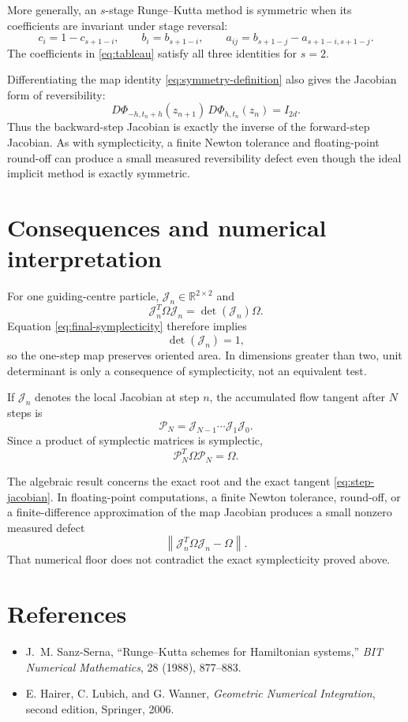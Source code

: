\documentclass[11pt,a4paper]{article}
\newcommand{\R}{\mathbb{R}}
\newcommand{\Id}{I}
\newcommand{\Om}{\Omega}
\newcommand{\Jn}{\mathcal{J}_n}
\begin{document}
More generally, an $s$-stage Runge--Kutta method is symmetric when its
coefficients are invariant under stage reversal:
\begin{equation}
 \boxed{
 c_i=1-c_{s+1-i},
 \qquad
 b_i=b_{s+1-i},
 \qquad
 a_{ij}=b_{s+1-j}-a_{s+1-i,s+1-j}.
 }
 \label{eq:rk-symmetry-condition}
\end{equation}
The coefficients in \eqref{eq:tableau} satisfy all three identities for
$s=2$.

Differentiating the map identity \eqref{eq:symmetry-definition} also gives the
Jacobian form of reversibility:
\begin{equation}
 \boxed{
 D\Phi_{-h,t_n+h}(z_{n+1})\,
 D\Phi_{h,t_n}(z_n)=\Id_{2d}.
 }
 \label{eq:jacobian-reversibility}
\end{equation}
Thus the backward-step Jacobian is exactly the inverse of the forward-step
Jacobian.  As with symplecticity, a finite Newton tolerance and floating-point
round-off can produce a small measured reversibility defect even though the
ideal implicit method is exactly symmetric.

\clearpage

\section{Consequences and numerical interpretation}

For one guiding-centre particle, $\Jn\in\R^{2\times2}$ and
\[
 \Jn^T\Om\Jn=\det(\Jn)\Om.
\]
Equation \eqref{eq:final-symplecticity} therefore implies
\[
 \det(\Jn)=1,
\]
so the one-step map preserves oriented area.  In dimensions greater than two,
unit determinant is only a consequence of symplecticity, not an equivalent
test.

If $\Jn$ denotes the local Jacobian at step $n$, the accumulated flow tangent
after $N$ steps is
\[
 \mathcal{P}_N=\mathcal{J}_{N-1}\cdots\mathcal{J}_1\mathcal{J}_0.
\]
Since a product of symplectic matrices is symplectic,
\[
 \mathcal{P}_N^T\Om\mathcal{P}_N=\Om.
\]

The algebraic result concerns the exact root and the exact tangent
\eqref{eq:step-jacobian}.  In floating-point computations, a finite Newton
tolerance, round-off, or a finite-difference approximation of the map
Jacobian produces a small nonzero measured defect
\[
 \left\lVert\Jn^T\Om\Jn-\Om\right\rVert.
\]
That numerical floor does not contradict the exact symplecticity proved above.

\section*{References}

\begin{itemize}
 \item J.~M. Sanz-Serna, ``Runge--Kutta schemes for Hamiltonian systems,''
       \emph{BIT Numerical Mathematics}, 28 (1988), 877--883.
 \item E. Hairer, C. Lubich, and G. Wanner,
       \emph{Geometric Numerical Integration}, second edition,
       Springer, 2006.
\end{itemize}
\end{document}
